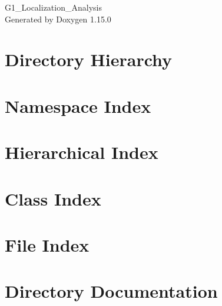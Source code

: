 \documentclass[twoside]{book}
\newcommand{\+}{\discretionary{\mbox{\scriptsize$\hookleftarrow$}}{}{}}
\newcommand{\clearemptydoublepage}{%
    \newpage{\pagestyle{empty}\cleardoublepage}%
  }
\begin{document}
  \raggedbottom
    \hypersetup{pageanchor=false,
                bookmarksnumbered=true,
                pdfencoding=unicode
               }
  \begin{titlepage}
  \vspace*{7cm}
  \begin{center}%
  {\Large G1\+\_\+\+Localization\+\_\+\+Analysis}\\
  \vspace*{1cm}
  {\large Generated by Doxygen 1.15.0}\\
  \end{center}
  \end{titlepage}
  \clearemptydoublepage
  \tableofcontents
  \clearemptydoublepage
  \hypersetup{pageanchor=true}


\chapter{Directory Hierarchy}

\chapter{Namespace Index}

\chapter{Hierarchical Index}

\chapter{Class Index}

\chapter{File Index}

\chapter{Directory Documentation}









\end{document}
